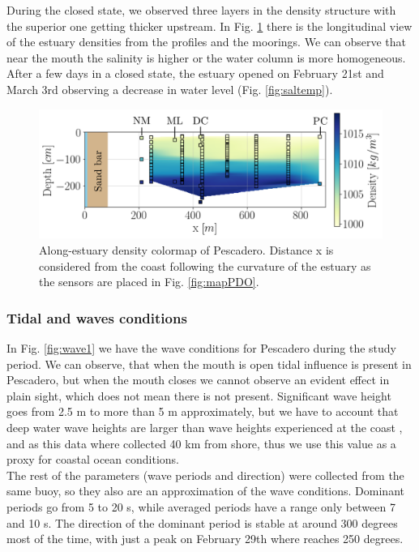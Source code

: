 \documentclass[tesis.tex]{subfiles}
\begin{document}
During the closed state, we observed three layers in the density structure with the superior one getting thicker upstream. In Fig. \ref{fig:perfiles1} there is the longitudinal view of the estuary densities from the profiles and the moorings. We can observe that near the mouth the salinity is higher or the water column is more homogeneous. After a few days in a closed state, the estuary opened on February 21st and March 3rd observing a decrease in water level (Fig. \ref{fig:saltemp}). \\

\begin{figure}[h!]
    \centering
    \includegraphics[scale=0.6]{Imagenes/vista_long2.png}
    \caption{Along-estuary density colormap of Pescadero. Distance x is considered from the coast following the curvature of the estuary as the sensors are placed in Fig. \ref{fig:mapPDO}. }
    \label{fig:perfiles1}
\end{figure}

\subsubsection{Tidal and waves conditions}

In Fig. \ref{fig:wave1} we have the wave conditions for Pescadero during the study period. We can observe, that when the mouth is open tidal influence is present in Pescadero, but when the mouth closes we cannot observe an evident effect in plain sight, which does not mean there is not present. Significant wave height goes from 2.5 m to more than 5 m approximately, but we have to account that deep water wave heights are larger than wave heights experienced at the coast \citep{Williams2014}, and as this data where collected 40 km from shore, thus we use this value as a proxy for coastal ocean conditions.  \\

The rest of the parameters (wave periods and direction) were collected from the same buoy, so they also are an approximation of the wave conditions. Dominant periods go from 5 to 20 s, while averaged periods have a range only between 7 and 10 s. The direction of the dominant period is stable at around 300 degrees most of the time, with just a peak on February 29th where reaches 250 degrees.\\
\end{document}
